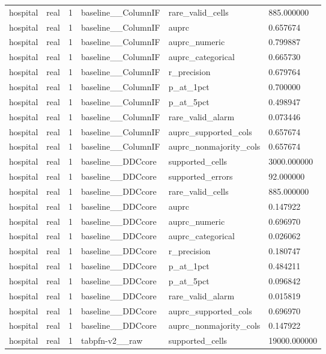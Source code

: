 \begin{tabular}{llllll}
hospital & real & 1 & baseline\_\_ColumnIF & rare\_valid\_cells & 885.000000 \\
hospital & real & 1 & baseline\_\_ColumnIF & auprc & 0.657674 \\
hospital & real & 1 & baseline\_\_ColumnIF & auprc\_numeric & 0.799887 \\
hospital & real & 1 & baseline\_\_ColumnIF & auprc\_categorical & 0.665730 \\
hospital & real & 1 & baseline\_\_ColumnIF & r\_precision & 0.679764 \\
hospital & real & 1 & baseline\_\_ColumnIF & p\_at\_1pct & 0.700000 \\
hospital & real & 1 & baseline\_\_ColumnIF & p\_at\_5pct & 0.498947 \\
hospital & real & 1 & baseline\_\_ColumnIF & rare\_valid\_alarm & 0.073446 \\
hospital & real & 1 & baseline\_\_ColumnIF & auprc\_supported\_cols & 0.657674 \\
hospital & real & 1 & baseline\_\_ColumnIF & auprc\_nonmajority\_cols & 0.657674 \\
hospital & real & 1 & baseline\_\_DDCcore & supported\_cells & 3000.000000 \\
hospital & real & 1 & baseline\_\_DDCcore & supported\_errors & 92.000000 \\
hospital & real & 1 & baseline\_\_DDCcore & rare\_valid\_cells & 885.000000 \\
hospital & real & 1 & baseline\_\_DDCcore & auprc & 0.147922 \\
hospital & real & 1 & baseline\_\_DDCcore & auprc\_numeric & 0.696970 \\
hospital & real & 1 & baseline\_\_DDCcore & auprc\_categorical & 0.026062 \\
hospital & real & 1 & baseline\_\_DDCcore & r\_precision & 0.180747 \\
hospital & real & 1 & baseline\_\_DDCcore & p\_at\_1pct & 0.484211 \\
hospital & real & 1 & baseline\_\_DDCcore & p\_at\_5pct & 0.096842 \\
hospital & real & 1 & baseline\_\_DDCcore & rare\_valid\_alarm & 0.015819 \\
hospital & real & 1 & baseline\_\_DDCcore & auprc\_supported\_cols & 0.696970 \\
hospital & real & 1 & baseline\_\_DDCcore & auprc\_nonmajority\_cols & 0.147922 \\
hospital & real & 1 & tabpfn-v2\_\_raw & supported\_cells & 19000.000000 \\

\end{tabular}
